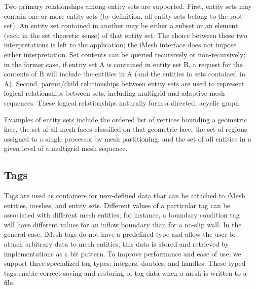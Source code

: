Two primary relationships among entity sets are supported. First,
entity sets may contain one or more entity sets (by definition, all
entity sets belong to the root set). An entity set contained
in another may be either a subset or an element (each in the set theoretic
sense) of that entity set. The choice between these two interpretations
is left to the application; the iMesh interface does not impose either
interpretation. Set contents can be queried recursively or non-recursively;
in the former case, if entity set A is contained in entity set B,
a request for the contents of B will include the entities in A (and
the entities in sets contained in A). Second, parent/child relationships
between entity sets are used to represent logical relationships between
sets, including multigrid and adaptive mesh sequences. These logical
relationships naturally form a directed, acyclic graph.

Examples of entity sets include the ordered list of vertices bounding
a geometric face, the set of all mesh faces classified on that geometric
face, the set of regions assigned to a single processor by mesh partitioning,
and the set of all entities in a given level of a multigrid mesh sequence. 


\subsection{Tags\label{sub:Tags}}

Tags are used as containers for user-defined data that can be attached
to iMesh entities, meshes, and entity sets. Different values of a particular
tag can be associated with different mesh entities; for instance,
a boundary condition tag will have different values for an inflow
boundary than for a no-slip wall. In the general case, iMesh tags do
not have a predefined type and allow the user to attach arbitrary
data to mesh entities; this data is stored and retrieved by implementations
as a bit pattern. To improve performance and ease of use, we support
three specialized tag types: integers, doubles, and handles. These
typed tags enable correct saving and restoring of tag data when a
mesh is written to a file.
